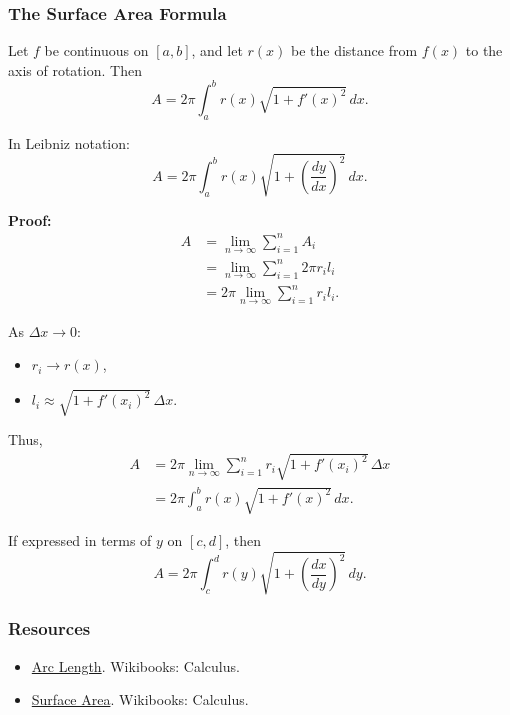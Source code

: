 \subsubsection{The Surface Area Formula}
\label{sss:thes-528f}

Let $f$ be continuous on $[a,b]$, and let $r(x)$ be the distance from 
$f(x)$ to the axis of rotation. Then
\[
A = 2\pi \int_a^b r(x)\sqrt{1 + f'(x)^2}\,dx.
\]

In Leibniz notation:
\[
A = 2\pi \int_a^b r(x)\sqrt{1 + \left(\frac{dy}{dx}\right)^2}\,dx.
\]

\textbf{Proof:}
\begin{align}
A &= \lim_{n\to\infty} \sum_{i=1}^n A_i \\
  &= \lim_{n\to\infty} \sum_{i=1}^n 2\pi r_i l_i \\
  &= 2\pi \lim_{n\to\infty} \sum_{i=1}^n r_i l_i.
\end{align}

As $\Delta x \to 0$:
\begin{itemize}
\item $r_i \to r(x)$,
\item $l_i \approx \sqrt{1 + f'(x_i)^2}\,\Delta x$.
\end{itemize}

Thus,
\begin{align}
A &= 2\pi \lim_{n\to\infty} \sum_{i=1}^n 
r_i \sqrt{1 + f'(x_i)^2}\,\Delta x \\
&= 2\pi \int_a^b r(x)\sqrt{1 + f'(x)^2}\,dx.
\end{align}

If expressed in terms of $y$ on $[c,d]$, then
\[
A = 2\pi \int_c^d r(y)\sqrt{1 + \left(\frac{dx}{dy}\right)^2}\,dy.
\]

\subsubsection{Resources}
\label{sss:reso-55b5}

\begin{itemize}
\item \href{https://en.wikibooks.org/wiki/Calculus/Arc_length}{Arc Length}.  
Wikibooks: Calculus.

\item \href{https://en.wikibooks.org/wiki/Calculus/Surface_area}{Surface Area}.  
Wikibooks: Calculus.
\end{itemize}


